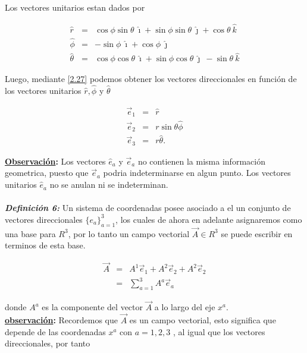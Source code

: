 \documentclass[12pt]{report}
\begin{document}
Los vectores unitarios estan dados por

\begin{eqnarray}
\hat{r} &=& \cos{\phi}\sin{\theta}  \ \hat{\imath} + \sin{\phi}\sin{\theta} \ \hat{\jmath} + \cos{\theta} \ \hat{k} \\
\hat{\phi} &=& - \sin{\phi} \ \hat{\imath}+ \cos{\phi} \ \hat{\jmath} \\
\hat{\theta} &=& \cos{\phi}\cos{\theta} \ \hat{\imath} + \sin{\phi}\cos{\theta}  \ \hat{\jmath} \ -\sin{\theta} \ \hat{k} 
\end{eqnarray}

Luego, mediante \eqref{2.27} podemos obtener los vectores direccionales en función de los vectores unitarios $\hat{r}, \hat{\phi}$ y $\hat{\theta}$

\begin{eqnarray}
\vec{e}_1 &=& \hat{r} \\
\vec{e}_2 &=& r\sin{\theta} \hat{\phi} \\
\vec{e}_3 &=& r \hat{\theta} .  %
\end{eqnarray}

\textbf{\underline{Observación}:} Los vectores $\hat{e}_a$ y $\vec{e}_a$ no contienen la misma información geometrica, puesto que $\vec{e}_a$ podria indeterminarse en algun punto. Los vectores unitarios $\hat{e}_a$ no se anulan ni se indeterminan.
 \\
 \\

\textbf{\textit{Definición 6:}} Un sistema de coordenadas posee asociado a el un conjunto de vectores direccionales $\{ e_{a} \}_{a=1}^3$, los cuales de ahora en adelante asignaremos como una base para $R^3$, por lo tanto un campo vectorial $ \vec{A} \in R^3 $ se puede escribir en terminos de esta base.


\begin{eqnarray}
\vec{A} &=& A^1 \vec{e}_1 + A^2 \vec{e}_2 + A^2 \vec{e}_2 \\ \label{2.42}
&=& \sum_{a=1}^3 A^a \vec{e}_a
\end{eqnarray} 

donde $A^a$ es la componente del vector $\vec{A}$ a lo largo del eje $x^a$.\\


\textbf{\underline{observación}:} Recordemos que $\vec{A}$ es un campo vectorial, esto significa que depende de las coordenadas $x^a$ con $a=1,2,3$ , al igual que los vectores direccionales, por tanto
\end{document}
